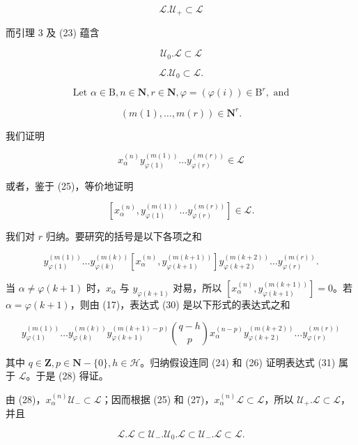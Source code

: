 \[
\mathcal {L}. \mathcal {U} _ {+} \subset \mathcal {L}\tag{25}
\]

而引理 3 及 (23) 蕴含

\[
\mathcal {U} _ {0}. \mathcal {L} \subset \mathcal {L}\tag{26}
\]

\[
\mathcal {L}. \mathcal {U} _ {0} \subset \mathcal {L}.\tag{27}
\]

\[
\text {   Let   } \alpha \in \mathrm{B}, n \in \mathbf {N}, r \in \mathbf {N}, \varphi = (\varphi (i)) \in \mathrm{B} ^ {r}, \text {   and   }
\]

\[
(m (1), \dots , m (r)) \in \mathbf {N} ^ {r}.
\]

我们证明

\[
x _ {\alpha} ^ {(n)} y _ {\varphi (1)} ^ {(m (1))} \dots y _ {\varphi (r)} ^ {(m (r))} \in \mathcal {L}\tag{28}
\]

或者，鉴于 (25)，等价地证明

\[
[ x _ {\alpha} ^ {(n)}, y _ {\varphi (1)} ^ {(m (1))} \dots y _ {\varphi (r)} ^ {(m (r))} ] \in \mathcal {L}.\tag{29}
\]

我们对 \(r\) 归纳。要研究的括号是以下各项之和

\[
y _ {\varphi (1)} ^ {(m (1))} \dots y _ {\varphi (k)} ^ {(m (k))} [ x _ {\alpha} ^ {(n)}, y _ {\varphi (k + 1)} ^ {(m (k + 1))} ] y _ {\varphi (k + 2)} ^ {(m (k + 2))} \dots y _ {\varphi (r)} ^ {(m (r))}.\tag{30}
\]

当 \(\alpha \neq \varphi (k + 1)\) 时，\(x_{\alpha}\) 与 \(y_{\varphi (k + 1)}\) 对易，所以 \([x_{\alpha}^{(n)},y_{\varphi (k + 1)}^{(m(k + 1))}] = 0\)。若 \(\alpha = \varphi (k + 1)\)，则由 (17)，表达式 (30) 是以下形式的表达式之和

\[
y _ {\varphi (1)} ^ {(m (1))} \dots y _ {\varphi (k)} ^ {(m (k))} y _ {\varphi (k + 1)} ^ {(m (k + 1) - p)} \binom{q - h}{p} x _ {\alpha} ^ {(n - p)} y _ {\varphi (k + 2)} ^ {(m (k + 2))} \dots y _ {\varphi (r)} ^ {(m (r))}\tag{31}
\]

其中 \(q \in \mathbf{Z}, p \in \mathbf{N} - \{0\}, h \in \mathcal{H}\)。归纳假设连同 (24) 和 (26) 证明表达式 (31) 属于 \(\mathcal{L}\)。于是 (28) 得证。

由 (28)，\(x_{\alpha}^{(n)}\mathcal{U}_{-}\subset \mathcal{L}\)；因而根据 (25) 和 (27)，\(x_{\alpha}^{(n)}\mathcal{L}\subset \mathcal{L}\)，所以 \(\mathcal{U}_{+}.\mathcal{L}\subset \mathcal{L}\)，并且

\[
\mathcal {L}. \mathcal {L} \subset \mathcal {U} _ {-}. \mathcal {U} _ {0}. \mathcal {L} \subset \mathcal {U} _ {-}. \mathcal {L} \subset \mathcal {L}.
\]

